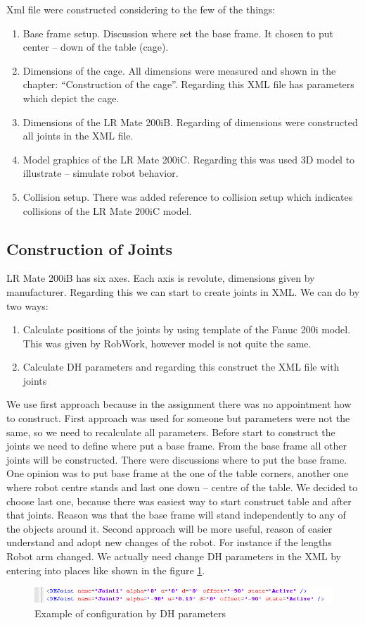 Xml file were constructed considering to the few of the things:
\begin{enumerate}
\item Base frame setup. Discussion where set the base frame. It chosen to put center – down of the table (cage).
\item Dimensions of the cage. All dimensions were measured and shown in the chapter: “Construction of the cage”. Regarding this XML file has parameters which depict the cage.
\item Dimensions of the LR Mate 200iB. Regarding of dimensions were constructed all joints in the XML file.
\item Model graphics of the LR Mate 200iC. Regarding this was used 3D model to illustrate – simulate robot behavior.
\item Collision setup. There was added reference to collision setup which indicates collisions of the LR Mate 200iC model.
\end{enumerate} 

\subsection{Construction of Joints}
LR Mate 200iB has six axes. Each axis is revolute, dimensions given by manufacturer. Regarding this we can start to create joints in XML. We can do by two ways:
\begin{enumerate}
\item Calculate positions of the joints by using template of the Fanuc 200i model. This was given by RobWork, however model is not quite the same.
\item Calculate DH parameters and regarding this construct the XML file with joints
\end{enumerate} 

We use first approach because in the assignment there was no appointment how to construct. First approach was used for someone but parameters were not the same, so we need to recalculate all parameters. Before start to construct the joints we need to define where put a base frame. From the base frame all other joints will be constructed. There were discussions where to put the base frame. One opinion was to put base frame at the one of the table corners, another one where robot centre stands and last one down – centre of the table. We decided to choose last one, because there was easiest way to start construct table and after that joints. Reason was that the base frame will stand independently to any of the objects around it.
Second approach will be more useful, reason of easier understand and adopt new changes of the robot. For instance if the lengths Robot arm changed. We actually need change DH parameters in the XML by entering into places like shown in the figure \ref{fig:DHParameters}. 

\begin{figure}[H]
  \centering
  \includegraphics[scale= 0.65]{source/DHParameters.png}
  \caption{Example of configuration by DH parameters}
  \label{fig:DHParameters}
\end{figure}




